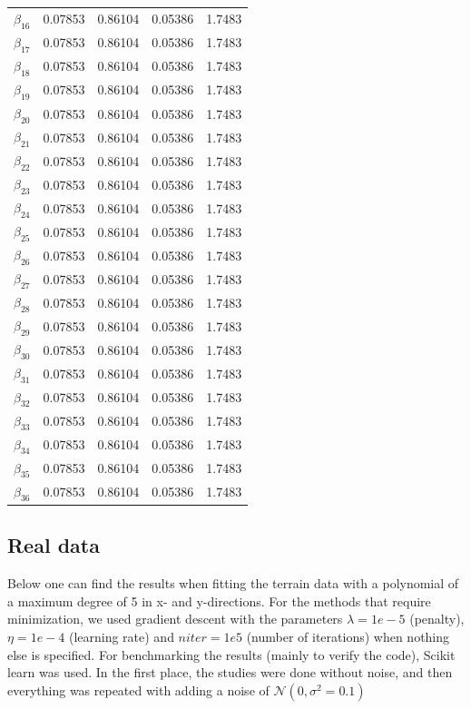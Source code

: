 \begin{table} [H]
\begin{tabularx}{\textwidth}{l|XXXX}
		$\beta_{16}$ & 0.07853 & 0.86104 & 0.05386 & 1.7483\\
		$\beta_{17}$ & 0.07853 & 0.86104 & 0.05386 & 1.7483\\
		$\beta_{18}$ & 0.07853 & 0.86104 & 0.05386 & 1.7483\\
		$\beta_{19}$ & 0.07853 & 0.86104 & 0.05386 & 1.7483\\
		$\beta_{20}$ & 0.07853 & 0.86104 & 0.05386 & 1.7483\\
		$\beta_{21}$ & 0.07853 & 0.86104 & 0.05386 & 1.7483\\
		$\beta_{22}$ & 0.07853 & 0.86104 & 0.05386 & 1.7483\\
		$\beta_{23}$ & 0.07853 & 0.86104 & 0.05386 & 1.7483\\
		$\beta_{24}$ & 0.07853 & 0.86104 & 0.05386 & 1.7483\\
		$\beta_{25}$ & 0.07853 & 0.86104 & 0.05386 & 1.7483\\
		$\beta_{26}$ & 0.07853 & 0.86104 & 0.05386 & 1.7483\\
		$\beta_{27}$ & 0.07853 & 0.86104 & 0.05386 & 1.7483\\
		$\beta_{28}$ & 0.07853 & 0.86104 & 0.05386 & 1.7483\\
		$\beta_{29}$ & 0.07853 & 0.86104 & 0.05386 & 1.7483\\
		$\beta_{30}$ & 0.07853 & 0.86104 & 0.05386 & 1.7483\\
		$\beta_{31}$ & 0.07853 & 0.86104 & 0.05386 & 1.7483\\
		$\beta_{32}$ & 0.07853 & 0.86104 & 0.05386 & 1.7483\\
		$\beta_{33}$ & 0.07853 & 0.86104 & 0.05386 & 1.7483\\
		$\beta_{34}$ & 0.07853 & 0.86104 & 0.05386 & 1.7483\\
		$\beta_{35}$ & 0.07853 & 0.86104 & 0.05386 & 1.7483\\
		$\beta_{36}$ & 0.07853 & 0.86104 & 0.05386 & 1.7483\\ \hline
	\end{tabularx}
\end{table}
\fi

\subsection{Real data}
Below one can find the results when fitting the terrain data with a polynomial of a maximum degree of 5 in x- and y-directions. For the methods that require minimization, we used gradient descent with the parameters $\lambda=1e-5$ (penalty), $\eta=1e-4$ (learning rate) and $niter=1e5$ (number of iterations) when nothing else is specified. For benchmarking the results (mainly to verify the code), Scikit learn was used. In the first place, the studies were done without noise, and then everything was repeated with adding a noise of $\mathcal{N}(0, \sigma^2=0.1)$

